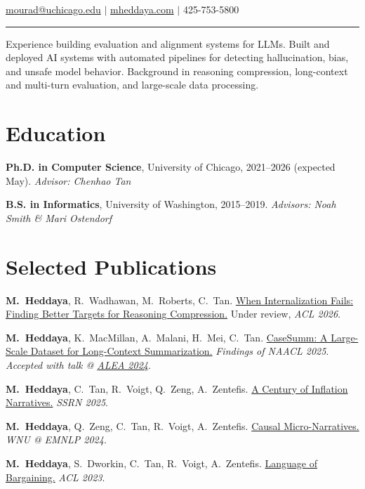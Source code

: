 \documentclass[11pt,letterpaper]{article}
\begin{document}
\hfill{\normalsize \href{mailto:mourad@uchicago.edu}{mourad@uchicago.edu} $|$ \href{https://mheddaya.com}{mheddaya.com} $|$ 425-753-5800}
\vspace{2pt}
\hrule

\vspace{12pt}
\noindent Experience building evaluation and alignment systems for LLMs.
Built and deployed AI systems with automated pipelines for detecting hallucination, bias, and unsafe model behavior.
Background in reasoning compression, long-context and multi-turn evaluation, and large-scale data processing.

\section*{Education}

\noindent\textbf{Ph.D. in Computer Science}, University of Chicago, 2021--2026 (expected May). \textit{Advisor: Chenhao Tan}

\vspace{4pt}

\noindent\textbf{B.S. in Informatics}, University of Washington, 2015--2019. \textit{Advisors: Noah Smith \& Mari Ostendorf}

\section*{Selected Publications}
\vspace{4pt}
\begin{enumerate}[label={[\arabic*]}, leftmargin=2em, topsep=2pt, itemsep=1pt, parsep=0pt]
    \item \textbf{M.\ Heddaya}, R.\ Wadhawan, M.\ Roberts, C.\ Tan. \href{https://mheddaya.com/papers/acl2026_abridge.pdf}{When Internalization Fails: Finding Better Targets for Reasoning Compression.} Under review, \textit{ACL 2026}.
    \item \textbf{M.\ Heddaya}, K.\ MacMillan, A.\ Malani, H.\ Mei, C.\ Tan. \href{https://arxiv.org/abs/2501.00097}{CaseSumm: A Large-Scale Dataset for Long-Context Summarization.} \textit{Findings of NAACL 2025}. \textit{Accepted with talk @ \href{https://www.amlecon.org}{ALEA 2024}}.
    \item \textbf{M.\ Heddaya}, C.\ Tan, R.\ Voigt, Q.\ Zeng, A.\ Zentefis. \href{https://papers.ssrn.com/sol3/papers.cfm?abstract_id=5259107}{A Century of Inflation Narratives.} \textit{SSRN 2025}.
    \item \textbf{M.\ Heddaya}, Q.\ Zeng, C.\ Tan, R.\ Voigt, A.\ Zentefis. \href{https://aclanthology.org/2024.wnu-1.12/}{Causal Micro-Narratives.} \textit{WNU @ EMNLP 2024}.
    \item \textbf{M.\ Heddaya}, S.\ Dworkin, C.\ Tan, R.\ Voigt, A.\ Zentefis. \href{https://aclanthology.org/2023.acl-long.735/}{Language of Bargaining.} \textit{ACL 2023}.
\end{enumerate}
\end{document}
